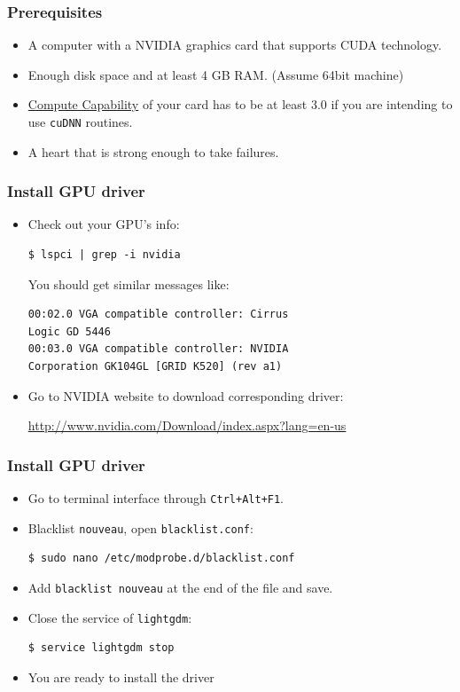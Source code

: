 \documentclass{beamer}
\begin{document}
\begin{frame}
\frametitle{Prerequisites}

\begin{itemize}
\item[\ding{112}] A computer with a NVIDIA graphics card that supports CUDA technology.
\item[\ding{112}] Enough disk space and at least 4 GB RAM. (Assume 64bit machine)
\item[\ding{112}] \href{https://developer.nvidia.com/cuda-gpus}{Compute Capability} of your card has to be at least 3.0 if you are intending to use \texttt{cuDNN} routines.
\item[\ding{112}] A heart that is strong enough to take failures.
\end{itemize}

\end{frame}

\begin{frame}[fragile]
\frametitle{Install GPU driver}

\begin{itemize}
\item[\ding{43}] Check out your GPU's info:
\begin{verbatim}
$ lspci | grep -i nvidia
\end{verbatim}
You should get similar messages like:
\begin{verbatim}
00:02.0 VGA compatible controller: Cirrus 
Logic GD 5446
00:03.0 VGA compatible controller: NVIDIA 
Corporation GK104GL [GRID K520] (rev a1)
\end{verbatim}

\item[\ding{43}] Go to NVIDIA website to download corresponding driver:

\url{http://www.nvidia.com/Download/index.aspx?lang=en-us}
\end{itemize}

\end{frame}

\begin{frame}[fragile]
  \frametitle{Install GPU driver}
  \begin{itemize}
    \item[\ding{43}] Go to terminal interface through \texttt{Ctrl+Alt+F1}.
    \item[\ding{43}] Blacklist \texttt{nouveau}, open \texttt{blacklist.conf}:
\begin{verbatim}
$ sudo nano /etc/modprobe.d/blacklist.conf
\end{verbatim}
    \item[\ding{43}] Add \texttt{blacklist nouveau} at the end of the file and save.
    \item[\ding{43}] Close the service of \texttt{lightgdm}:
\begin{verbatim}
$ service lightgdm stop
\end{verbatim}
    \item[\ding{43}] You are ready to install the driver
  \end{itemize}
\end{frame}
\end{document}
